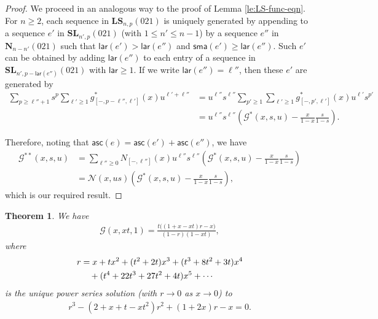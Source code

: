 \documentclass[reqno]{amsart}
\numberwithin{equation}{section}
\theoremstyle{plain}
\newtheorem{theorem}{Theorem}[section]
\theoremstyle{definition}
\theoremstyle{named}
\newcommand{\bN}{\mathbf{N}}
\newcommand{\bSL}{\mathbf{SL}}
\newcommand{\bLS}{\mathbf{LS}}
\newcommand{\asc}{\mathsf{asc}}
\newcommand{\lar}{\mathsf{lar}}
\newcommand{\sma}{\mathsf{sma}}
\newcommand{\cN}{\mathcal{N}}
\newcommand{\cG}{\mathcal{G}}
\newcommand{\coN}{N}
\begin{document}
\begin{proof}
	We proceed in an analogous way to the proof of Lemma \ref{le:LS-func-eqn}. For $n\ge 2$, each sequence in $\bLS_{n,p}(021)$ is uniquely generated by appending to a sequence $e'$ in $\bSL_{n',p}(021)$ (with $1\le n'\le n-1$) by a sequence $e''$ in $\bN_{n-n'}(021)$ such that $\lar(e')>\lar(e'')$ and $\sma(e')\ge \lar(e'')$. Such $e'$ can be obtained by adding $\lar(e'')$ to each entry of a sequence in $\bSL_{n',p-\lar(e'')}(021)$ with $\lar\ge 1$. If we write $\lar(e'')=\ell''$, then these $e'$ are generated by
	\begin{align*}
		\sum_{p\ge \ell''+1}s^p\sum_{\ell'\ge 1}g^*_{[-,p-\ell'',\ell']}(x)u^{\ell'+\ell''}&=u^{\ell''}s^{\ell''}\sum_{p'\ge 1}\sum_{\ell'\ge 1}g^*_{[-,p',\ell']}(x)u^{\ell'}s^{p'}\\
		
		&=u^{\ell''}s^{\ell''}\left(\cG^*(x,s,u)-\frac{x}{1-x}\frac{s}{1-s}\right).
	\end{align*}
	
	Therefore, noting that $\asc(e)=\asc(e')+\asc(e'')$, we have
	\begin{align*}
		\cG^{**}(x,s,u)&=\sum_{\ell''\ge 0}\coN_{[-,\ell'']}(x)u^{\ell''}s^{\ell''}\left(\cG^*(x,s,u)-\frac{x}{1-x}\frac{s}{1-s}\right)\\
		&=\cN(x,us)\left(\cG^*(x,s,u)-\frac{x}{1-x}\frac{s}{1-s}\right),
	\end{align*}
	which is our required result.
\end{proof}

\begin{theorem}
	We have
	\begin{align}\label{eq:F}
		\cG(x,xt,1)=\frac{t\big((1+x-xt) r-x\big)}{(1-r)(1-xt)},
	\end{align}
	where
	\begin{align}\label{eq:x-expansion}
		r&=x + t x^2 + (t ^2+2 t) x^3 + (t ^3+8 t ^2+3 t) x^4\notag\\
		&\quad + (t ^4+22 t ^3+27 t ^2+4 t) x^5+\cdots
	\end{align}
	is the unique power series solution (with $r\to 0$ as $x\to 0$) to
	\begin{align}\label{eq:kernel-poly}
		r^3-(2+x+t-xt^2)r^2+(1+2x)r-x=0.
	\end{align}
\end{theorem}
\end{document}
